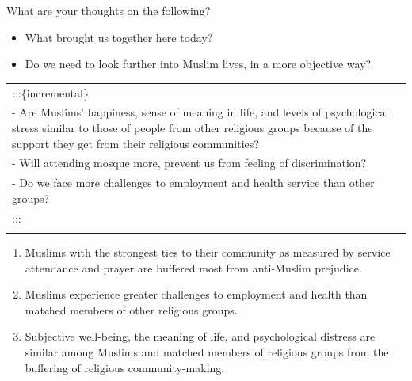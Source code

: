\documentclass[
  ignorenonframetext,
  aspectratio=169,
]{beamer}
\providecommand{\tightlist}{%
  \setlength{\itemsep}{0pt}\setlength{\parskip}{0pt}}\usepackage{longtable,booktabs,array}
\begin{document}
\begin{frame}{What are your thoughts on the following?}
\label{what-are-your-thoughts-on-the-following}
\begin{itemize}
\tightlist
\item
  What brought us together here today?
\item
  Do we need to look further into Muslim lives, in a more objective way?
\end{itemize}

\begin{longtable}[]{@{}l@{}}
\toprule\noalign{}
\endhead
:::\{incremental\} \\
- Are Muslims' happiness, sense of meaning in life, and levels of
psychological stress similar to those of people from other religious
groups because of the support they get from their religious
communities? \\
- Will attending mosque more, prevent us from feeling of
discrimination? \\
- Do we face more challenges to employment and health service than other
groups? \\
::: \\
\bottomrule\noalign{}
\end{longtable}

\begin{enumerate}
\item
  Muslims with the strongest ties to their community as measured by
  service attendance and prayer are buffered most from anti-Muslim
  prejudice.
\item
  Muslims experience greater challenges to employment and health than
  matched members of other religious groups.
\item
  Subjective well-being, the meaning of life, and psychological distress
  are similar among Muslims and matched members of religious groups from
  the buffering of religious community-making.
\end{enumerate}
\end{frame}
\end{document}
